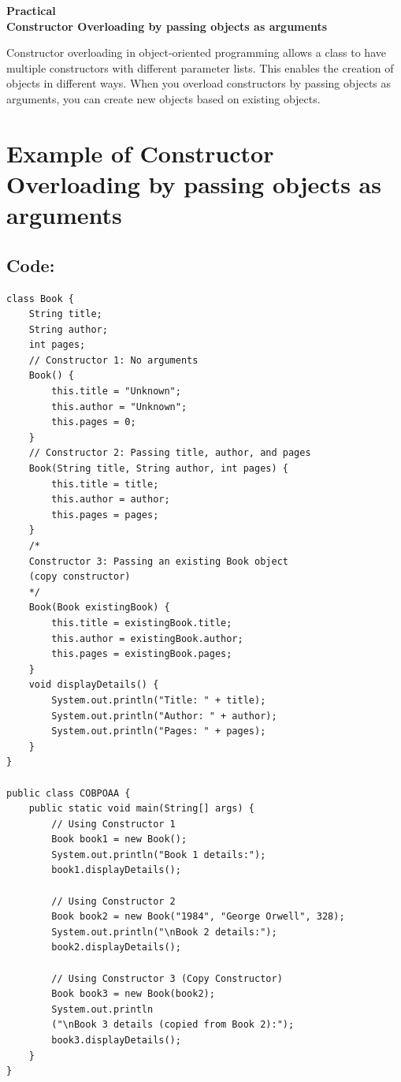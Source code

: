 \documentclass[a4paper,12pt]{article}
\newcounter{practicalno} %
\newcommand{\practicaltitle}[1]{
    \stepcounter{practicalno} %
    \newpage
    \begin{center}
        \vspace{1cm}
        \Large\textbf{Practical \thepracticalno} \\
        \vspace{0.5cm}
        \Large\textbf{#1} %
        \normalsize\vspace{1cm}
    \end{center}
}
\begin{document}
\setcounter{section}{0}

\practicaltitle{Constructor Overloading by passing objects as arguments}
Constructor overloading in object-oriented programming allows a class to have multiple constructors with different parameter lists. This enables the creation of objects in different ways. When you overload constructors by passing objects as arguments, you can create new objects based on existing objects.

\section{Example of Constructor Overloading by passing objects as arguments}
\subsection{Code: }
\begin{lstlisting}
class Book {
    String title;
    String author;
    int pages;
    // Constructor 1: No arguments
    Book() {
        this.title = "Unknown";
        this.author = "Unknown";
        this.pages = 0;
    }
    // Constructor 2: Passing title, author, and pages
    Book(String title, String author, int pages) {
        this.title = title;
        this.author = author;
        this.pages = pages;
    }
    /*
    Constructor 3: Passing an existing Book object
    (copy constructor)
    */
    Book(Book existingBook) {
        this.title = existingBook.title;
        this.author = existingBook.author;
        this.pages = existingBook.pages;
    }
    void displayDetails() {
        System.out.println("Title: " + title);
        System.out.println("Author: " + author);
        System.out.println("Pages: " + pages);
    }
}

public class COBPOAA {
    public static void main(String[] args) {
        // Using Constructor 1
        Book book1 = new Book();
        System.out.println("Book 1 details:");
        book1.displayDetails();

        // Using Constructor 2
        Book book2 = new Book("1984", "George Orwell", 328);
        System.out.println("\nBook 2 details:");
        book2.displayDetails();

        // Using Constructor 3 (Copy Constructor)
        Book book3 = new Book(book2);
        System.out.println
        ("\nBook 3 details (copied from Book 2):");
        book3.displayDetails();
    }
}    
\end{lstlisting}
\end{document}

